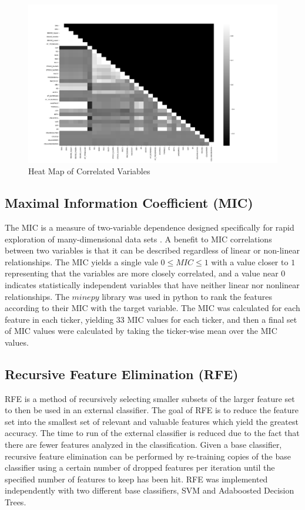 \documentclass{article}\raggedbottom
\begin{document}
\begin{figure}[h!]
	\centering
	\includegraphics[width=\linewidth]{data/heatmapT1.png}
	\caption{Heat Map of Correlated Variables}
	\label{fig:corr_heatmap}
\end{figure}

\subsection{Maximal Information Coefficient (MIC)}\raggedbottom
The MIC is a measure of two-variable dependence designed specifically for rapid exploration of many-dimensional data sets \cite{reshef2011detecting}. A benefit to MIC correlations between two variables is that it can be described regardless of linear or non-linear relationships. The MIC yields a single vale $0 \leq MIC \leq 1$ with a value closer to $1$ representing that the variables are more closely correlated, and a value near $0$ indicates statistically independent variables that have neither linear nor nonlinear relationships. The $minepy$ library was used in python to rank the features according to their MIC with the target variable. The MIC was calculated for each feature in each ticker, yielding 33 MIC values for each ticker, and then a final set of MIC values were calculated by taking the ticker-wise mean over the MIC values.

\subsection{Recursive Feature Elimination (RFE)}
RFE is a method of recursively selecting smaller subsets of the larger feature set to then be used in an external classifier. The goal of RFE is to reduce the feature set into the smallest set of relevant and valuable features which yield the greatest accuracy. The time to run of the external classifier is reduced due to the fact that there are fewer features analyzed in the classification.
Given a base classifier, recursive feature elimination can be performed by re-training copies of the base classifier using a certain number of dropped features per iteration until the specified number of features to keep has been hit. RFE was implemented independently with two different base classifiers, SVM and Adaboosted Decision Trees.
\end{document}

